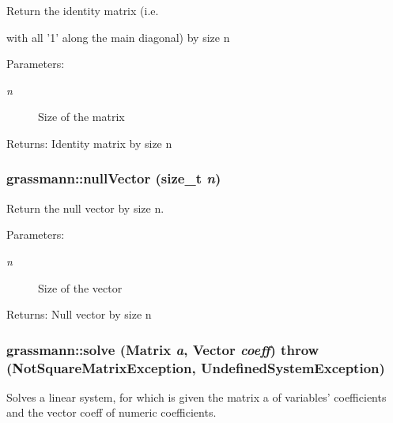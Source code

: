 Return the identity matrix (i.e. 

with all '1' along the main diagonal) by size n \begin{Desc}
\item[Parameters:]
\begin{description}
\item[{\em n}]Size of the matrix \end{description}
\end{Desc}
\begin{Desc}
\item[Returns:]Identity matrix by size n \end{Desc}
\hypertarget{namespacegrassmann_f05f7cfa12aaac77dbbd4bb494e74972}{
\subsubsection[nullVector]{ grassmann::nullVector (size\_\-t {\em n})}}
\label{namespacegrassmann_f05f7cfa12aaac77dbbd4bb494e74972}


Return the null vector by size n. 

\begin{Desc}
\item[Parameters:]
\begin{description}
\item[{\em n}]Size of the vector \end{description}
\end{Desc}
\begin{Desc}
\item[Returns:]Null vector by size n \end{Desc}
\hypertarget{namespacegrassmann_bc7cc2e4f7133d5867c3eeb29c506f2b}{
\subsubsection[solve]{ grassmann::solve (Matrix {\em a}, \/  Vector {\em coeff})  throw ({\bf NotSquareMatrixException}, {\bf UndefinedSystemException})}}
\label{namespacegrassmann_bc7cc2e4f7133d5867c3eeb29c506f2b}


Solves a linear system, for which is given the matrix a of variables' coefficients and the vector coeff of numeric coefficients. 

